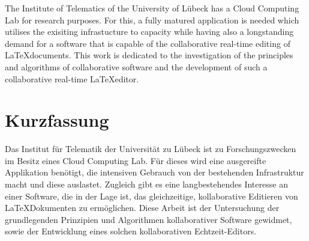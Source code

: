 The Institute of Telematics of the University of Lübeck has a Cloud Computing Lab for research purposes. For this, a fully matured application is needed which utilises the exisiting infrastucture to capacity while having also a longstanding demand for a software that is capable of the collaborative real-time editing of \LaTeX documents. This work is dedicated to the investigation of the principles and algorithms of collaborative software and the development of such a collaborative real-time \LaTeX editor.

%
\vskip 3cm
%

\section*{Kurzfassung}

Das Institut für Telematik der Universität zu Lübeck ist zu Forschungszwecken im Besitz eines Cloud Computing Lab. Für dieses wird eine ausgereifte Applikation benötigt, die intensiven Gebrauch von der bestehenden Infrastruktur macht und diese auslastet. Zugleich gibt es eine langbestehendes Interesse an einer Software, die in der Lage ist, das gleichzeitige, kollaborative Editieren von \LaTeX Dokumenten zu ermöglichen. Diese Arbeit ist der Untersuchung der grundlegenden Prinzipien und Algorithmen kollaborativer Software gewidmet, sowie der Entwicklung eines solchen kollaborativen Echtzeit-Editors.

\cleardoublepage



